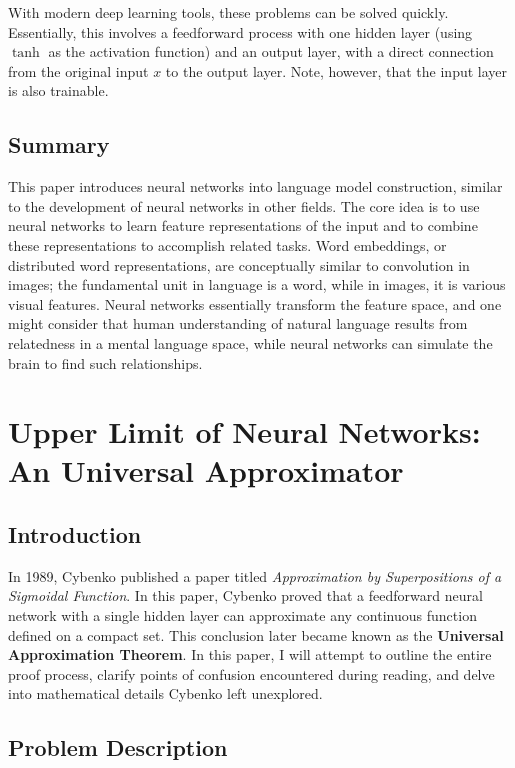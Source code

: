 \documentclass[11p,oneside]{book}
\begin{document}
With modern deep learning tools, these problems can be solved quickly. Essentially, this involves a feedforward process with one hidden layer (using $\tanh$ as the activation function) and an output layer, with a direct connection from the original input $x$ to the output layer. Note, however, that the input layer is also trainable.

\section*{Summary}

This paper introduces neural networks into language model construction, similar to the development of neural networks in other fields. The core idea is to use neural networks to learn feature representations of the input and to combine these representations to accomplish related tasks. Word embeddings, or distributed word representations, are conceptually similar to convolution in images; the fundamental unit in language is a word, while in images, it is various visual features. Neural networks essentially transform the feature space, and one might consider that human understanding of natural language results from relatedness in a mental language space, while neural networks can simulate the brain to find such relationships.

\chapter{Upper Limit of Neural Networks: An Universal Approximator}


\section*{Introduction}

In 1989, Cybenko published a paper titled \textit{Approximation by Superpositions of a Sigmoidal Function}. In this paper, Cybenko proved that a feedforward neural network with a single hidden layer can approximate any continuous function defined on a compact set. This conclusion later became known as the \textbf{Universal Approximation Theorem}. In this paper, I will attempt to outline the entire proof process, clarify points of confusion encountered during reading, and delve into mathematical details Cybenko left unexplored.

\section*{Problem Description}
\end{document}
